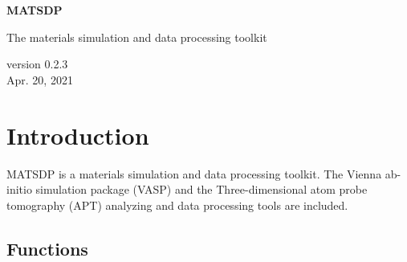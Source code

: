 \documentclass[12pt]{book}
\begin{document}

\begin{titlepage}
\begin{center}
\vspace*{1cm}

\Huge
\textbf{MATSDP}

\vspace{0.5cm}
\LARGE The materials simulation and data processing toolkit
\vspace{1.5cm}

\vfill

\vspace{0.8cm}

\small version 0.2.3\\
\small Apr. 20, 2021

\end{center}
\end{titlepage}

\tableofcontents

\chapter{Introduction}
MATSDP is a materials simulation and data processing toolkit. The Vienna ab-initio simulation package (VASP) and the Three-dimensional atom probe tomography (APT) analyzing and data processing tools are included. 

\section{Functions}
\end{document}
